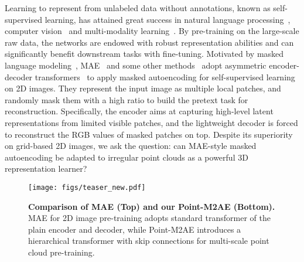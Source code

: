 \documentclass{article}
\begin{document}
Learning to represent from unlabeled data without annotations, known as self-supervised learning, has attained great success in natural language processing~\cite{bert,gpt1,gpt2,gpt3}, computer vision~\cite{he2020momentum,chen2020simple,chen2021exploring,mae} and multi-modality learning~\cite{clip,zhang2021pointclip,align}. By pre-training on the large-scale raw data, the networks are endowed with robust representation abilities and can significantly benefit downstream tasks with fine-tuning. Motivated by masked language modeling~\cite{gpt1,bert}, MAE~\cite{mae} and some other methods~\cite{xie2021simmim,zhou2021ibot,baevski2022data2vec} adopt asymmetric encoder-decoder transformers~\cite{vit} to apply masked autoencoding for self-supervised learning on 2D images. They represent the input image as multiple local patches, and randomly mask them with a high ratio to build the pretext task for reconstruction. 
Specifically, the encoder aims at capturing high-level latent representations from limited visible patches, and the lightweight decoder is forced to reconstruct the RGB values of masked patches on top. 
Despite its superiority on grid-based 2D images, we ask the question: can MAE-style masked autoencoding be adapted to irregular point clouds as a powerful 3D representation learner?
\begin{figure*}[t!]
  \centering
    \texttt{[image: figs/teaser\_new.pdf]}
    \vspace{0.01cm}
   \caption{\textbf{Comparison of MAE (Top) and our Point-M2AE (Bottom).} MAE for 2D image pre-training adopts standard transformer of the plain encoder and decoder, while Point-M2AE introduces a hierarchical transformer with skip connections for multi-scale point cloud pre-training.}
\label{fig1}
\end{figure*}
\end{document}
